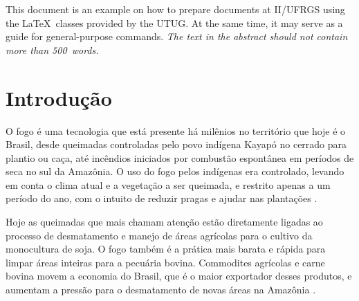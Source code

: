 \documentclass[cic,tc]{iiufrgs}
\begin{document}

\listoffigures

\listoftables

\begin{abstract}
Este documento é um exemplo de como formatar documentos para o
Instituto de Informática da UFRGS usando as classes \LaTeX\
disponibilizadas pelo UTUG\@. Ao mesmo tempo, pode servir de consulta
para comandos mais genéricos. \emph{O texto do resumo não deve
conter mais do que 500 palavras.}
\end{abstract}

\begin{translatedabstract}
This document is an example on how to prepare documents at II/UFRGS
using the \LaTeX\ classes provided by the UTUG\@. At the same time, it
may serve as a guide for general-purpose commands. \emph{The text in
the abstract should not contain more than 500~words.}
\end{translatedabstract}



\chapter{Introdução}

O fogo é uma tecnologia que está presente há milênios no território que hoje é o Brasil, desde queimadas controladas pelo povo indígena Kayapó no cerrado para plantio ou caça, até incêndios iniciados por combustão espontânea em períodos de seca no sul da Amazônia. O uso do fogo pelos indígenas era controlado, levando em conta o clima atual e a vegetação a ser queimada, e restrito apenas a um período do ano, com o intuito de reduzir pragas e ajudar nas plantações \citep{leonel_2000}.

Hoje as queimadas que mais chamam atenção estão diretamente ligadas ao processo de desmatamento e manejo de áreas agrícolas para o cultivo da monocultura de soja. O fogo também é a prática mais barata e rápida para limpar áreas inteiras para a pecuária bovina. Commodites agrícolas e carne bovina movem a economia do Brasil, que é o maior exportador desses produtos, e aumentam a pressão para o desmatamento de novas áreas na Amazônia \citep{fuchs_2020}.
\end{document}
